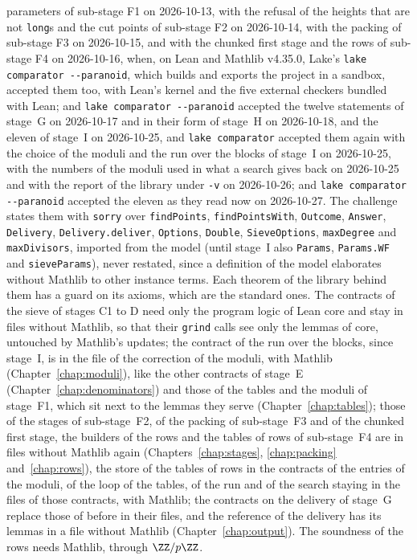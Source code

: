 parameters of sub-stage F1 on 2026-10-13, with the refusal of the heights that are not \verb|long|s
and the cut points of sub-stage F2 on 2026-10-14, with the packing of sub-stage F3 on 2026-10-15,
and with the chunked first stage and the rows of sub-stage F4 on 2026-10-16, when, on Lean and
Mathlib v4.35.0, Lake's \verb|lake comparator --paranoid|, which builds and exports the project in a
sandbox, accepted them too, with Lean's kernel and the five external checkers bundled with Lean; and
\verb|lake comparator --paranoid| accepted the twelve statements of stage~G on 2026-10-17 and in
their form of stage~H on 2026-10-18, and the eleven of stage~I on 2026-10-25, and
\verb|lake comparator| accepted them again with the choice of the moduli and the run over the blocks
of stage~I on 2026-10-25, with the numbers of the moduli used in what a search gives back on
2026-10-25 and with the report of the library under \verb|-v| on 2026-10-26; and
\verb|lake comparator --paranoid| accepted the eleven as they read now on 2026-10-27. The challenge
states them with \verb|sorry| over \verb|findPoints|, \verb|findPointsWith|, \verb|Outcome|,
\verb|Answer|, \verb|Delivery|, \verb|Delivery.deliver|, \verb|Options|, \verb|Double|,
\verb|SieveOptions|, \verb|maxDegree| and \verb|maxDivisors|, imported from the model (until stage~I
also \verb|Params|, \verb|Params.WF| and \verb|sieveParams|), never restated, since a definition of
the model elaborates without Mathlib to other instance terms. Each theorem of the library behind
them has a guard on its axioms, which are the standard ones. The contracts of the sieve of stages C1
to D need only the program logic of Lean core and stay in files without Mathlib, so that their
\verb|grind| calls see only the lemmas of core, untouched by Mathlib's updates; the contract of the
run over the blocks, since stage~I, is in the file of the correction of the moduli, with Mathlib
(Chapter~\ref{chap:moduli}), like the other contracts of stage~E (Chapter~\ref{chap:denominators})
and those of the tables and the moduli of stage~F1, which sit next to the lemmas they serve
(Chapter~\ref{chap:tables}); those of the stages of sub-stage~F2, of the packing of sub-stage~F3 and
of the chunked first stage, the builders of the rows and the tables of rows of sub-stage~F4 are in
files without Mathlib again (Chapters~\ref{chap:stages}, \ref{chap:packing} and~\ref{chap:rows}),
the store of the tables of rows in the contracts of the entries of the moduli, of the loop of the
tables, of the run and of the search staying in the files of those contracts, with Mathlib; the
contracts on the delivery of stage~G replace those of before in their files, and the reference of
the delivery has its lemmas in a file without Mathlib (Chapter~\ref{chap:output}). The soundness of
the rows needs Mathlib, through $\ZZ/p\ZZ$.

